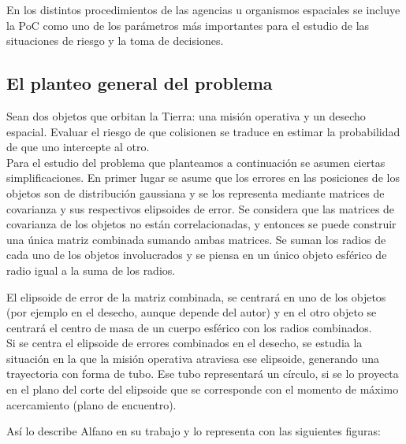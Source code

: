 En los distintos procedimientos de las agencias u organismos espaciales se incluye la PoC como uno de los par\'ametros m\'as importantes para el estudio de las situaciones de riesgo y la toma de decisiones.

\subsection{El planteo general del problema}
Sean dos objetos que orbitan la Tierra: una misi\'on operativa y un desecho espacial. Evaluar el riesgo de que colisionen se traduce en estimar la probabilidad de que uno intercepte al otro.\\

Para el estudio del problema que planteamos a continuaci\'on se asumen ciertas simplificaciones. En primer lugar se asume que los errores en las posiciones de los objetos son de distribuci\'on gaussiana y se los representa mediante matrices de covarianza y sus respectivos elipsoides de error. Se considera que las matrices de covarianza de los objetos no est\'an correlacionadas, y entonces se puede construir una \'unica matriz combinada sumando ambas matrices. Se suman los radios de cada uno de los objetos involucrados  y se piensa en un \'unico objeto esf\'erico de radio igual a la suma de los radios. 

El elipsoide de error de la matriz combinada, se centrar\'a en uno de los objetos (por ejemplo en el desecho, aunque depende del autor) y en el otro objeto se centrar\'a el centro de masa de un cuerpo esf\'erico con los radios combinados. \\

Si se centra el elipsoide de errores combinados en el desecho, se estudia la situaci\'on en la que la misi\'on operativa atraviesa ese elipsoide, generando una trayectoria con forma de tubo. Ese tubo representar\'a un c\'irculo, si se lo proyecta en el plano del corte del elipsoide que se corresponde con el momento de m\'aximo acercamiento (plano de encuentro). 

As\'i lo describe Alfano en su trabajo \citep{alfano2007review} y lo representa con las siguientes figuras:


